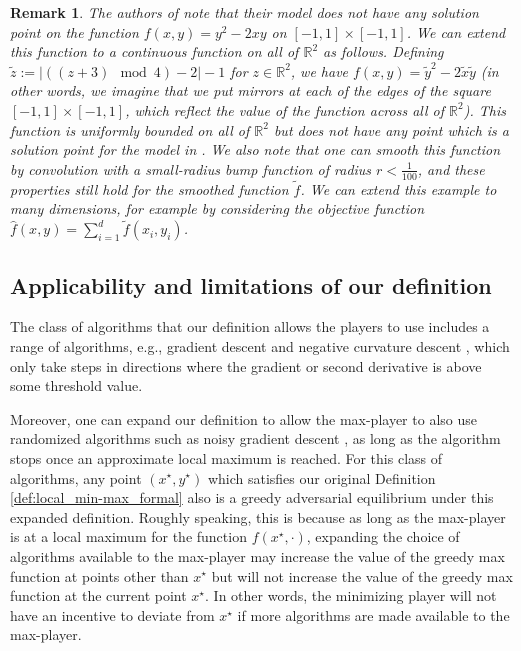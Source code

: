 \documentclass[11pt,letterpaper]{article}
\newtheorem{remark}[theorem]{Remark}
\begin{document}
\begin{remark} \label{example_nonexistance}
%
 The authors of \cite{minmax_Jordan} note that their model does not have any solution point on the function $f(x,y) = y^2 - 2xy$ on $[-1,1] \times [-1,1]$. 
  We can extend this function to a continuous function on all of $\mathbb{R}^2$ as follows. 
  Defining $\tilde{z} := | ((z+3) \mod 4) -2|-1$ for $z \in \mathbb{R}^2$, we have $f(x,y) = \tilde{y}^2 -2\tilde{x}\tilde{y}$  (in other words, we imagine that we put mirrors at each of the edges of the square $[-1,1] \times [-1,1]$, which reflect the value of the function across all of $\mathbb{R}^2$). 
    This function is uniformly bounded on all of $\mathbb{R}^2$ but does not have any point which is a solution point for the model in \cite{minmax_Jordan}.  
  We also note that one can smooth this function by convolution with a small-radius bump function of radius $r<\frac{1}{100}$, and these properties still hold for the smoothed function $\tilde{f}$.
  We can extend this example to many dimensions, for example by considering the objective function $\hat{f}(x,y) = \sum_{i=1}^d \tilde{f}(x_i,y_i)$.

\end{remark}

\subsection{Applicability and limitations of our definition}
 

 The class of algorithms that our definition allows the players to use includes a range of algorithms, e.g.,  gradient descent and negative curvature descent \cite{liu2018adaptive, reddi2018generic}, which only take steps in directions where the gradient or second derivative is above some threshold value.
  
Moreover, one can expand our definition to allow the max-player to also use randomized algorithms such as noisy gradient descent \cite{NonconvexOptimizationForML}, as long as the algorithm stops once an approximate local maximum is reached. 
%
%
For this class of algorithms, any point $(x^\star, y^\star)$ which satisfies our original Definition \ref{def:local_min-max_formal}  also is a greedy adversarial equilibrium under this expanded definition.  
%
Roughly speaking, this is because as long as the max-player is at a local maximum for the function $f(x^\star,\cdot)$, expanding the choice of algorithms available to the max-player may increase the value of the greedy max function at points other than $x^\star$ but will not increase the value of the greedy max function at the current point $x^\star$. 
%
In other words, the minimizing player will not have an incentive to deviate from $x^\star$ if more algorithms are made available to the max-player.
\end{document}
